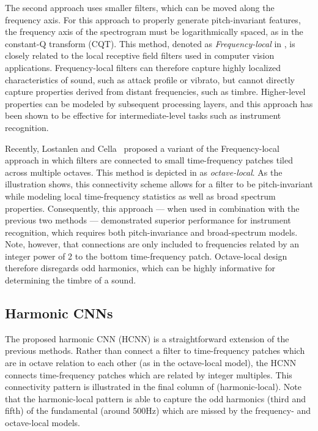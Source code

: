 \documentclass{article}
\begin{document}
The second approach uses smaller filters, which can be moved along the frequency axis.
For this approach to properly generate pitch-invariant features, the frequency axis of the spectrogram must be logarithmically spaced, as in the constant-Q transform (CQT).
This method, denoted as \emph{Frequency-local} in , is closely related to the local receptive field filters used in computer vision applications.
Frequency-local filters can therefore capture highly localized characteristics of sound, such as attack profile or vibrato, but cannot directly capture properties derived from distant frequencies, such as timbre.
Higher-level properties can be modeled by subsequent processing layers, and this approach has been shown to be effective for intermediate-level tasks such as instrument recognition. %


Recently, Lostanlen and Cella~\cite{lostanlen2016} proposed a variant of the Frequency-local approach in which filters are connected to small time-frequency patches tiled across multiple octaves.
This method is depicted in  as \emph{octave-local}.
As the illustration shows, this connectivity scheme allows for a filter to be pitch-invariant while modeling local time-frequency statistics as well as broad spectrum properties.
Consequently, this approach --- when used in combination with the previous two methods --- demonstrated superior performance for instrument recognition, which requires both pitch-invariance and broad-spectrum models.
Note, however, that connections are only included to frequencies related by an integer power of 2 to the bottom time-frequency patch.
Octave-local design therefore disregards odd harmonics, which can be highly informative for determining the timbre of a sound.


\subsection{Harmonic CNNs}

The proposed harmonic CNN (HCNN) is a straightforward extension of the previous methods.
Rather than connect a filter to time-frequency patches which are in octave relation to each other (as in the octave-local model), the HCNN connects time-frequency patches which are related by integer multiples.
This connectivity pattern is illustrated in the final column of  (harmonic-local).
Note that the harmonic-local pattern is able to capture the odd harmonics (third and fifth)  of the fundamental (around 500Hz) which are missed by the frequency- and octave-local models.
\end{document}
